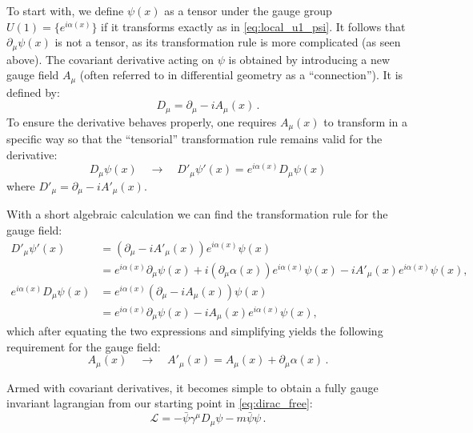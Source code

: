 To start with, we define \(\psi(x)\) as a tensor under the gauge group \(U(1) = \{e^{i\alpha(x)}\}\) if it transforms exactly as in \eqref{eq:local_u1_psi}. It follows that \(\partial_\mu\psi(x)\) is not a tensor, as its transformation rule is more complicated (as seen above). The covariant derivative acting on \(\psi\) is obtained by introducing a new gauge field \(A_\mu\) (often referred to in differential geometry as a ``connection''). It is defined by:
\begin{equation} \label{eq:covariant_derivative}
    D_\mu = \partial_\mu - iA_\mu(x) \, .
\end{equation}
To ensure the derivative behaves properly, one requires \(A_\mu(x)\) to transform in a specific way so that the ``tensorial'' transformation rule remains valid for the derivative:
\begin{equation} \label{eq:tensor_transform}
    D_\mu\psi(x) \quad \rightarrow \quad D'_\mu\psi'(x) = e^{i\alpha(x)}D_\mu\psi(x)
\end{equation}
where \(D'_\mu = \partial_\mu - iA'_\mu(x)\).

With a short algebraic calculation we can find the transformation rule for the gauge field:
\[
    \begin{aligned}
        D'_\mu\psi'(x)             & = (\partial_\mu - iA'_\mu(x))e^{i\alpha(x)}\psi(x)                                                                      \\
                                   & = e^{i\alpha(x)}\partial_\mu\psi(x) + i(\partial_\mu\alpha(x))e^{i\alpha(x)}\psi(x) - iA'_\mu(x)e^{i\alpha(x)}\psi(x) , \\
        e^{i\alpha(x)}D_\mu\psi(x) & = e^{i\alpha(x)}(\partial_\mu - iA_\mu(x))\psi(x)                                                                       \\
                                   & = e^{i\alpha(x)}\partial_\mu\psi(x) - iA_\mu(x)e^{i\alpha(x)}\psi(x) ,
    \end{aligned}
\]
which after equating the two expressions and simplifying yields the following requirement for the gauge field:
\begin{equation} \label{eq:gauge_field_transform}
    A_\mu(x) \quad \rightarrow \quad A'_\mu(x) = A_\mu(x) + \partial_\mu\alpha(x) \, .
\end{equation}

Armed with covariant derivatives, it becomes simple to obtain a fully gauge invariant lagrangian from our starting point in \eqref{eq:dirac_free}:
\begin{equation} \label{eq:lagrangian_gauged}
    \boxed{\mathcal{L} = -\bar{\psi}\gamma^\mu D_\mu\psi - m\bar{\psi}\psi} \, .
\end{equation}

